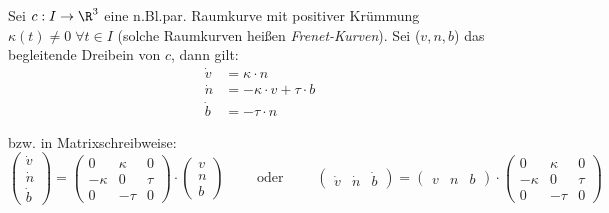 \documentclass{mycourse}
\begin{document}
\begin{st}
\label{7.7}

Sei $c: I \to \R^3$ eine n.Bl.par. Raumkurve mit positiver Krümmung $\kappa(t) \neq 0 \; \forall t \in I$ (solche Raumkurven heißen \emph{Frenet-Kurven}). Sei ($v, n, b$) das begleitende Dreibein von $c$, dann gilt:
\begin{align*}
\dot v &= \kappa \cdot n \\
\dot n &= - \kappa \cdot v + \tau \cdot b \\
\dot b &= - \tau \cdot n
\end{align*}

bzw. in Matrixschreibweise:
\[
\begin{pmatrix} \dot v \\ \dot n \\ \dot b \end{pmatrix} = \begin{pmatrix} 0 & \kappa & 0 \\ -\kappa & 0 & \tau \\ 0 & -\tau & 0   \end{pmatrix} \cdot \begin{pmatrix} v \\ n \\ b \end{pmatrix} \qquad \text{ oder } \qquad  \begin{pmatrix} \dot v & \dot n & \dot b \end{pmatrix} = \begin{pmatrix} v & n & b \end{pmatrix} \cdot \begin{pmatrix} 0 & \kappa & 0 \\ -\kappa & 0 & \tau \\ 0 & -\tau & 0   \end{pmatrix} \]


\end{st}
\end{document}

